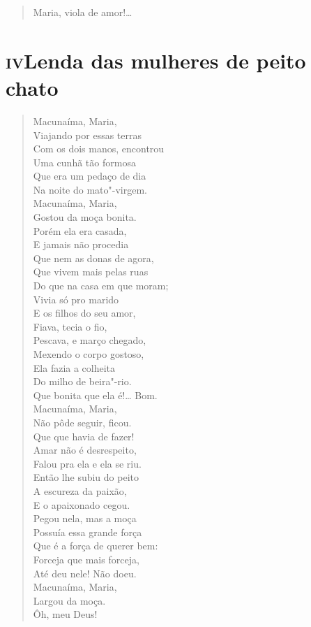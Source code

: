 {\begin{verse}
Maria, viola de amor!\ldots{}
\end{verse}

\pagebreak
\section*{\textsc{iv}\break Lenda das mulheres de peito chato}

\begin{verse}
Macunaíma, Maria,\\
Viajando por essas terras\\
Com os dois manos, encontrou\\
Uma cunhã tão formosa\\
Que era um pedaço de dia\\
Na noite do mato"-virgem.\\
Macunaíma, Maria,\\
Gostou da moça bonita.\\
Porém ela era casada,\\
E jamais não procedia\\
Que nem as donas de agora,\\
Que vivem mais pelas ruas\\
Do que na casa em que moram;\\
Vivia só pro marido\\
E os filhos do seu amor,\\
Fiava, tecia o fio,\\
Pescava, e março chegado,\\
Mexendo o corpo gostoso,\\
Ela fazia a colheita\\
Do milho de beira"-rio.\\
Que bonita que ela é!\ldots{} Bom.\\
Macunaíma, Maria,\\
Não pôde seguir, ficou.\\
Que que havia de fazer!\\
Amar não é desrespeito,\\
Falou pra ela e ela se riu.\\
Então lhe subiu do peito\\
A escureza da paixão,\\
E o apaixonado cegou.\\
Pegou nela, mas a moça\\
Possuía essa grande força\\
Que é a força de querer bem:\\
Forceja que mais forceja,\\
Até deu nele! Não doeu.\\
Macunaíma, Maria,\\
Largou da moça.\\
\qquad\qquad\qquad{}Ôh, meu Deus!


\end{verse}}

